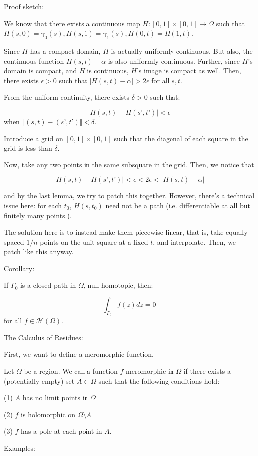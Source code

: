 \documentclass[10pt]{article}
\newcommand{\calH}{\mathcal{H}}
\begin{document}
Proof sketch:

We know that there exists a continuous map $H: [0,1] \times [0,1] \to \Omega$ such that $H(s,0) = \gamma_0(s), H(s,1) = \gamma_1(s), H(0,t) = H(1,t)$.

Since $H$ has a compact domain, $H$ is actually uniformly continuous. But also, the continuous function $H(s,t) - \alpha$ is also uniformly continuous. Further, since $H$’s domain is compact, and $H$ is continuous, $H$’s image is compact as well. Then, there exists $\epsilon > 0$ such that $|H(s,t) - \alpha| > 2\epsilon$ for all $s,t$.

From the uniform continuity, there exists $\delta > 0$ such that:

$$ |H(s,t) - H(s’,t’)| < \epsilon $$ when $\Vert (s,t) - (s’,t’) \Vert < \delta$.

Introduce a grid on $[0,1] \times [0,1]$ such that the diagonal of each square in the grid is less than $\delta$.

Now, take any two points in the same subsquare in the grid. Then, we notice that 

$$|H(s,t) - H(s’,t’)| < \epsilon < 2\epsilon < |H(s,t) - \alpha|  $$

and by the last lemma, we try to patch this together. However, there’s a technical issue here: for each $t_0$, $H(s,t_0)$ need not be a path (i.e. differentiable at all but finitely many points.).

The solution here is to instead make them piecewise linear, that is, take equally spaced $1/n$ points on the unit square at a fixed $t$, and interpolate. Then, we patch like this anyway.

Corollary:

If $\Gamma_0$ is a closed path in $\Omega$, null-homotopic, then:

$$\int_{\Gamma_0} f(z) dz = 0$$ for all $f \in \calH(\Omega)$.

The Calculus of Residues:

First, we want to define a meromorphic function.

Let $\Omega$ be a region. We call a function $f$ meromorphic in $\Omega$ if there exists a (potentially empty) set $A \subset \Omega$ such that the following conditions hold:

(1) $A$ has no limit points in $\Omega$

(2) $f$ is holomorphic on $\Omega \setminus A$

(3) $f$ has a pole at each point in $A$.

Examples:
\end{document}
